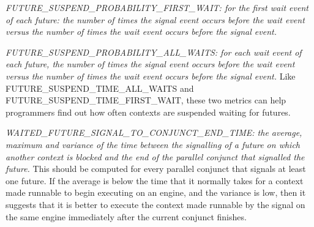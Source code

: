 

\emph{FUTURE\_SUSPEND\_PROBABILITY\_FIRST\_WAIT:
for the first wait event of each future:
the number of times the signal event occurs before the wait event versus
the number of times the wait event occurs before the signal event.}

\emph{FUTURE\_SUSPEND\_PROBABILITY\_ALL\_WAITS:
for each wait event of each future,
the number of times the signal event occurs before the wait event versus
the number of times the wait event occurs before the signal event.}
Like FUTURE\_SUSPEND\_TIME\_ALL\_WAITS and FUTURE\_SUSPEND\_TIME\_FIRST\_WAIT,
these two metrics can help programmers find out
how often contexts are suspended waiting for futures.

\emph{WAITED\_FUTURE\_SIGNAL\_TO\_CONJUNCT\_END\_TIME:
the average, maximum and variance of the time
between the signalling of a future on which another context is blocked
and the end of the parallel conjunct that signalled the future.}
This should be computed for every parallel conjunct
that signals at least one future.
If the average is below the time that it normally takes
for a context made runnable to begin executing on an engine,
and the variance is low, then it suggests that
it is better to execute the context made runnable by the signal
on the same engine immediately after the current conjunct finishes.

